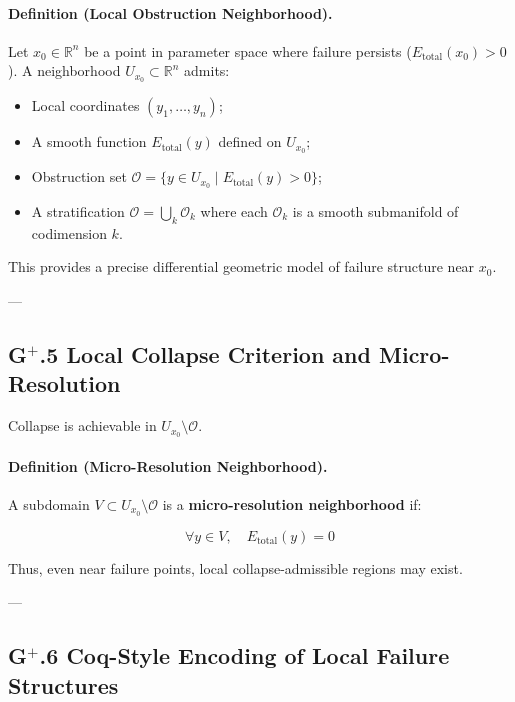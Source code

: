 \documentclass[11pt]{article}
\begin{document}
\paragraph{Definition (Local Obstruction Neighborhood).}

Let $x_0 \in \mathbb{R}^n$ be a point in parameter space where failure persists ($E_{\mathrm{total}}(x_0) > 0$).  
A neighborhood $U_{x_0} \subset \mathbb{R}^n$ admits:

\begin{itemize}
    \item Local coordinates $(y_1, \ldots, y_n)$;
    \item A smooth function $E_{\mathrm{total}}(y)$ defined on $U_{x_0}$;
    \item Obstruction set $\mathcal{O} = \{ y \in U_{x_0} \mid E_{\mathrm{total}}(y) > 0 \}$;
    \item A stratification $\mathcal{O} = \bigcup_{k} \mathcal{O}_k$ where each $\mathcal{O}_k$ is a smooth submanifold of codimension $k$.
\end{itemize}

This provides a precise differential geometric model of failure structure near $x_0$.

---

\subsection*{G$^{+}$.5 Local Collapse Criterion and Micro-Resolution}

Collapse is achievable in $U_{x_0} \setminus \mathcal{O}$.

\paragraph{Definition (Micro-Resolution Neighborhood).}

A subdomain $V \subset U_{x_0} \setminus \mathcal{O}$ is a \textbf{micro-resolution neighborhood} if:

\[
\forall y \in V, \quad E_{\mathrm{total}}(y) = 0
\]

Thus, even near failure points, local collapse-admissible regions may exist.

---

\subsection*{G$^{+}$.6 Coq-Style Encoding of Local Failure Structures}
\end{document}
